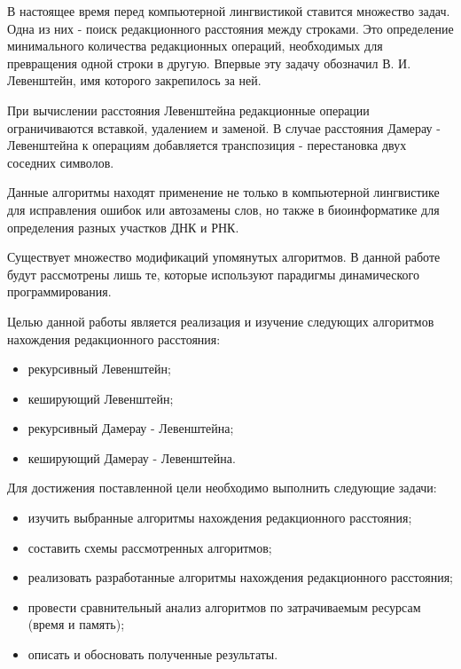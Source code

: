 \setcounter{page}{4}

В настоящее время перед компьютерной лингвистикой ставится множество задач. Одна из них - поиск редакционного расстояния между строками. Это определение минимального количества редакционных операций, необходимых для превращения одной строки в другую. Впервые эту задачу обозначил В. И. Левенштейн, имя которого закрепилось за ней.

При вычислении расстояния Левенштейна редакционные операции ограничиваются вставкой, удалением и заменой. В случае расстояния Дамерау - Левенштейна к операциям добавляется транспозиция - перестановка двух соседних символов.

Данные алгоритмы находят применение не только в компьютерной лингвистике для исправления ошибок или автозамены слов, но также в биоинформатике для определения разных участков ДНК и РНК.

Существует множество модификаций упомянутых алгоритмов. В данной работе будут рассмотрены лишь те, которые используют парадигмы динамического программирования.

Целью данной работы является реализация и изучение следующих алгоритмов нахождения редакционного расстояния:

\begin{itemize}
    \item рекурсивный Левенштейн;
    \item кеширующий Левенштейн;
    \item рекурсивный Дамерау - Левенштейна;
    \item кеширующий Дамерау - Левенштейна.
\end{itemize}

Для достижения поставленной цели необходимо выполнить следующие задачи:

\begin{itemize}
	\item изучить выбранные алгоритмы нахождения редакционного расстояния;
	\item составить схемы рассмотренных алгоритмов;
	\item реализовать разработанные алгоритмы нахождения редакционного расстояния;
	\item провести сравнительный анализ алгоритмов по затрачиваемым ресурсам (время и память);
	\item описать и обосновать полученные результаты.
\end{itemize}
